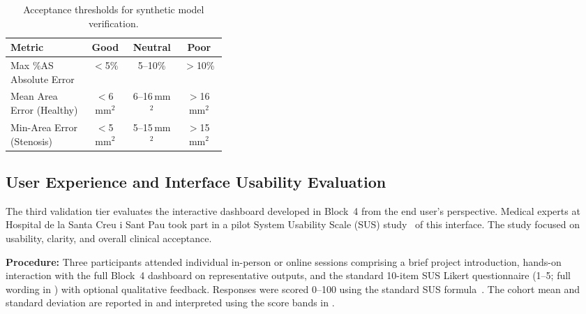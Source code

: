 \begin{table}[H]
  \caption{Acceptance thresholds for synthetic model verification.}
  \label{tab:validation-synthetic-thresholds}
  \vspace{0.5em}
  \centering
  \small
  \renewcommand{\arraystretch}{1.35}
  \setlength{\tabcolsep}{6pt}
  \begin{tabular}{@{}>{\raggedright\arraybackslash}p{0.36\linewidth}ccc@{}}
    \toprule
    \cellcolor{gray!12}\textbf{Metric} &
    \cellcolor{gray!12}\textbf{Good} &
    \cellcolor{gray!12}\textbf{Neutral} &
    \cellcolor{gray!12}\textbf{Poor} \\
    \midrule
    Max \%AS Absolute Error & $<$5\% & 5--10\% & $>$10\% \\
    Mean Area Error (Healthy) & $<$6\,mm$^2$ & 6--16\,mm$^2$ & $>$16\,mm$^2$ \\
    Min-Area Error (Stenosis) & $<$5\,mm$^2$ & 5--15\,mm$^2$ & $>$15\,mm$^2$ \\
    \bottomrule
  \end{tabular}
\end{table}

\subsection{User Experience and Interface Usability Evaluation}
\label{subsec:validation-ux}

The third validation tier evaluates the interactive dashboard developed in Block~4 from the end user's perspective. Medical experts at Hospital de la Santa Creu i Sant Pau took part in a pilot System Usability Scale (SUS) study~\cite{brooke1996} of this interface. The study focused on usability, clarity, and overall clinical acceptance.

\textbf{Procedure:} Three participants attended individual in-person or online sessions comprising a brief project introduction, hands-on interaction with the full Block~4 dashboard on representative outputs, and the standard 10-item SUS Likert questionnaire (1--5; full wording in ) with optional qualitative feedback. Responses were scored 0--100 using the standard SUS formula~\cite{brooke1996}. The cohort mean and standard deviation are reported in  and interpreted using the score bands in .

